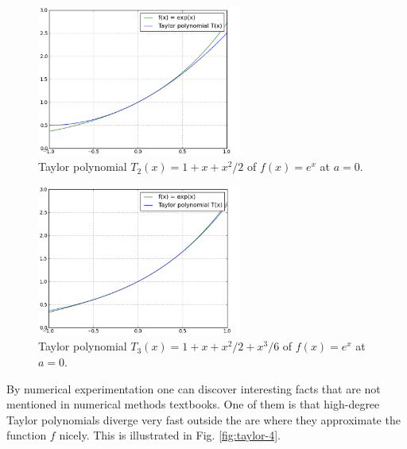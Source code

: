 \documentclass{article}
\begin{document}
\begin{figure}[!ht]
\begin{center}
\includegraphics[width=0.6\textwidth]{img/taylor-2.png}
\end{center}
\vspace{-2mm}
\caption{Taylor polynomial $T_2(x) = 1+x+x^2/2$ of $f(x) = e^x$ at $a = 0$.}
\label{fig:taylor-2}
\vspace{6mm}
\end{figure}

\begin{figure}[!ht]
\begin{center}
\includegraphics[width=0.6\textwidth]{img/taylor-3.png}
\end{center}
\vspace{-2mm}
\caption{Taylor polynomial $T_3(x) = 1+x+x^2/2+x^3/6$ of $f(x) = e^x$ at $a = 0$.}
\label{fig:taylor-3}
\end{figure}
\noindent
By numerical experimentation one can discover interesting facts that are not 
mentioned in numerical methods textbooks. One of them is that high-degree 
Taylor polynomials diverge very fast outside the are where they 
approximate the function $f$ nicely. This is illustrated in Fig. \ref{fig:taylor-4}.
\end{document}
